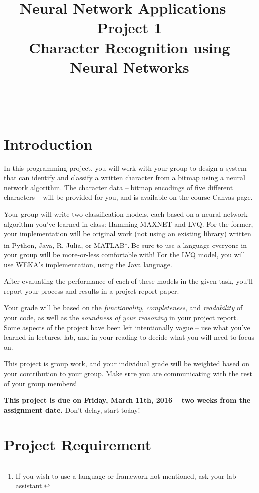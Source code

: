 \documentclass[11pt]{cselabheader}
\title{Neural Network Applications -- Project 1 \\ Character Recognition using Neural Networks}
\begin{document}
\maketitle

\horrule{0.5pt}\\\horrule{2pt}

\section{Introduction}

In this programming project, you will work with your group to design a system that can identify and classify a written character from a bitmap using a neural network algorithm. The character data -- bitmap encodings of five different characters -- will be provided for you, and is available on the course Canvas page.

Your group will write two classification models, each based on a neural network algorithm you've learned in class: Hamming-MAXNET and LVQ. For the former, your implementation will be original work (not using an existing library) written in Python, Java, R, Julia, or MATLAB\footnote{If you wish to use a language or framework not mentioned, ask your lab assistant.}. Be sure to use a language everyone in your group will be more-or-less comfortable with! For the LVQ model, you will use WEKA's implementation, using the Java language.

After evaluating the performance of each of these models in the given task, you'll report your process and results in a project report paper.

Your grade will be based on the \textit{functionality}, \textit{completeness}, and \textit{readability} of your code, as well as the \textit{soundness of your reasoning} in your project report. Some aspects of the project have been left intentionally vague -- use what you've learned in lectures, lab, and in your reading to decide what you will need to focus on.

This project is group work, and your individual grade will be weighted based on your contribution to your group. Make sure you are communicating with the rest of your group members!

\textbf{This project is due on Friday, March 11th, 2016 -- two weeks from the assignment date.} Don't delay, start today!

\pagebreak

\section{Project Requirement}
\end{document}
